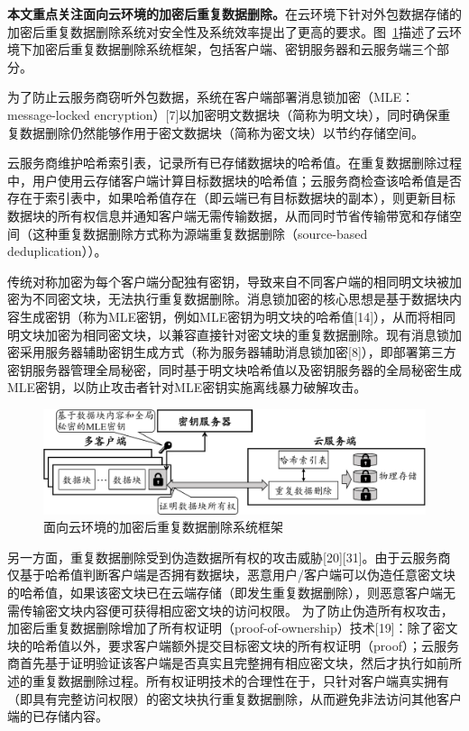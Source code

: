 \textbf{本文重点关注面向云环境的加密后重复数据删除。}在云环境下针对外包数据存储的加密后重复数据删除系统对安全性及系统效率提出了更高的要求。图~\ref{fig:Cloud-based-encrypted-deduplication-storage-logic}描述了云环境下加密后重复数据删除系统框架，包括客户端、密钥服务器和云服务端三个部分。

为了防止云服务商窃听外包数据，系统在客户端部署消息锁加密（MLE：message-locked encryption）[7]以加密明文数据块（简称为明文块），同时确保重复数据删除仍然能够作用于密文数据块（简称为密文块）以节约存储空间。


云服务商维护哈希索引表，记录所有已存储数据块的哈希值。在重复数据删除过程中，用户使用云存储客户端计算目标数据块的哈希值；云服务商检查该哈希值是否存在于索引表中，如果哈希值存在（即云端已有目标数据块的副本），则更新目标数据块的所有权信息并通知客户端无需传输数据，从而同时节省传输带宽和存储空间（这种重复数据删除方式称为源端重复数据删除（source-based deduplication））。





传统对称加密为每个客户端分配独有密钥，导致来自不同客户端的相同明文块被加密为不同密文块，无法执行重复数据删除。消息锁加密的核心思想是基于数据块内容生成密钥（称为MLE密钥，例如MLE密钥为明文块的哈希值[14]），从而将相同明文块加密为相同密文块，以兼容直接针对密文块的重复数据删除。现有消息锁加密采用服务器辅助密钥生成方式（称为服务器辅助消息锁加密[8]），即部署第三方密钥服务器管理全局秘密，同时基于明文块哈希值以及密钥服务器的全局秘密生成MLE密钥，以防止攻击者针对MLE密钥实施离线暴力破解攻击。
\begin{figure}[!htb]
    \small
    \centering
    \includegraphics[width=\textwidth]{pic/Cloud-encrypted-deduplication-logic.pdf}
    \caption{面向云环境的加密后重复数据删除系统框架}
    \label{fig:Cloud-based-encrypted-deduplication-storage-logic}
\end{figure}
另一方面，重复数据删除受到伪造数据所有权的攻击威胁[20][31]。由于云服务商仅基于哈希值判断客户端是否拥有数据块，恶意用户/客户端可以伪造任意密文块的哈希值，如果该密文块已在云端存储（即发生重复数据删除），则恶意客户端无需传输密文块内容便可获得相应密文块的访问权限。
为了防止伪造所有权攻击，加密后重复数据删除增加了所有权证明（proof-of-ownership）技术[19]：除了密文块的哈希值以外，要求客户端额外提交目标密文块的所有权证明（proof）；云服务商首先基于证明验证该客户端是否真实且完整拥有相应密文块，然后才执行如前所述的重复数据删除过程。所有权证明技术的合理性在于，只针对客户端真实拥有（即具有完整访问权限）的密文块执行重复数据删除，从而避免非法访问其他客户端的已存储内容。


